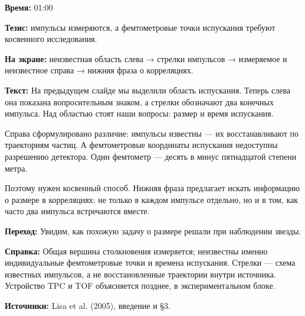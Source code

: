 \textbf{Время:} 01:00

\textbf{Тезис:} импульсы измеряются, а фемтометровые точки испускания требуют косвенного исследования.

\textbf{На экране:} неизвестная область слева → стрелки импульсов → измеряемое и неизвестное справа → нижняя фраза о корреляциях.

\textbf{Текст:} На предыдущем слайде мы выделили область испускания. Теперь слева она показана вопросительным знаком, а стрелки обозначают два конечных импульса. Над областью стоят наши вопросы: размер и время испускания.

Справа сформулировано различие: импульсы известны — их восстанавливают по траекториям частиц. А фемтометровые координаты испускания недоступны разрешению детектора. Один фемтометр — десять в минус пятнадцатой степени метра.

Поэтому нужен косвенный способ. Нижняя фраза предлагает искать информацию о размере в корреляциях: не только в каждом импульсе отдельно, но и в том, как часто два импульса встречаются вместе.

\textbf{Переход:} Увидим, как похожую задачу о размере решали при наблюдении звезды.

\textbf{Справка:} Общая вершина столкновения измеряется; неизвестны именно индивидуальные фемтометровые точки и времена испускания. Стрелки — схема известных импульсов, а не восстановленные траектории внутри источника. Устройство TPC и TOF объясняется позднее, в экспериментальном блоке.

\textbf{Источники:} Lisa et al. (2005), введение и §3.
